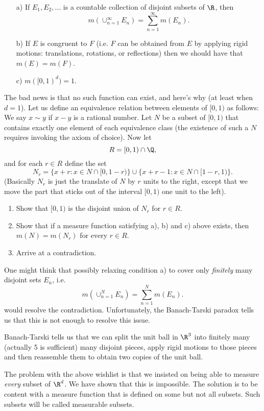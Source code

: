 \documentclass[12pt]{amsart}
\theoremstyle{definition}
\theoremstyle{remark}
\renewcommand{\bold}[1]{\medskip \noindent {\bf #1 }\nopagebreak}
\begin{document}
\begin{enumerate}
\item[a)] If $E_1, E_2, \ldots$ is a countable collection of disjoint subsets of $\R$, then 
$$
m(\cup_{n=1}^\infty E_n)=\sum_{n=1}^\infty m(E_n).
$$
\item[b)] If $E$ is congruent to $F$ (i.e. $F$ can be obtained from $E$ by applying rigid motions: translations, rotations, or reflections) then we should have that $m(E)=m(F)$.
\item[c)] $m([0,1)^d)=1$.
\end{enumerate} 

The bad news is that no such function can exist, and here's why (at least when $d=1$). Let us define an equivalence relation between elements of $[0,1)$ as follows: We say $x\sim y$ if $x-y$ is a rational number. Let $N$ be a subset of $[0,1)$ that contains exactly one element of each equivalence class (the existence of such a $N$ requires invoking the axiom of choice). Now let $$R=[0,1)\cap \Q,$$ and for each $r\in R$ define the set 
$$
N_r=\{x+r: x\in N\cap [0,1-r)\}\cup \{x+r-1: x\in N\cap [1-r, 1)\}.
$$
(Basically $N_r$ is just the translate of $N$ by $r$ units to the right, except that we move the part that sticks out of the interval $[0,1)$ one unit to the left).
\begin{enumerate}
\item Show that $[0,1)$ is the disjoint union of $N_r$ for $r\in R$.
\item Show that if a measure function satisfying a), b) and c) above exists, then $m(N)=m(N_r)$ for every $r\in R$.
\item Arrive at a contradiction.
\end{enumerate}

\bold{Remark:} One might think that possibly relaxing condition a) to cover only \emph{finitely} many disjoint sets $E_n$, i.e. 
        $$
m(\cup_{n=1}^N E_n)=\sum_{n=1}^N m(E_n).
$$    
would resolve the contradiction. Unfortunately, the Banach-Tarski paradox tells us that this is not enough to resolve this issue. 

Banach-Tarski tells us that we can split the unit ball in $\R^3$ into finitely many (actually 5 is sufficient) many disjoint pieces, apply rigid motions to those pieces and then reassemble them to obtain two copies of the unit ball.

\bold{Conclusion:} The problem with the above wishlist is that we insisted on being able to measure \emph{every} subset of $\R^d$. We have shown that this is impossible. The solution is to be content with a measure function that is defined on some but not all subsets. Such subsets will be called measurable subsets.
\end{document}
